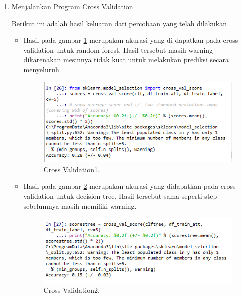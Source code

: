 \begin{enumerate}
\item Menjalankan Program Cross Validation \par
Berikut ini adalah hasil keluaran dari percobaan yang telah dilakukan
\begin{itemize}
\item Hasil pada gambar \ref{cross1} merupakan akurasi yang di dapatkan pada cross validation untuk random forest. Hasil tersebut masih warning dikarenakan mesinnya tidak kuat untuk melakukan prediksi secara menyeluruh
 		\begin{figure}[ht]
		\centerline{\includegraphics[width=1\textwidth]{figures/im/cross1.png}}
		\caption{Cross Validation1.}
		\label{cross1}
		\end{figure}

\item Hasil pada gambar \ref{cross2} merupakan akurasi yang didapatkan pada cross validation untuk decision tree. Hasil tersebut sama seperti step sebelumnya masih memiliki warning.
 		\begin{figure}[ht]
		\centerline{\includegraphics[width=1\textwidth]{figures/im/cross2.png}}
		\caption{Cross Validation2.}
		\label{cross2}
		\end{figure}


\end{itemize}
\end{enumerate}

